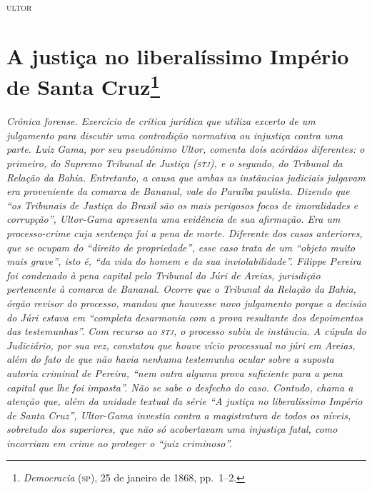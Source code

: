 \begin{flushright}
\textsc{ultor}
\end{flushright}

\chapter{A justiça no liberalíssimo Império de Santa Cruz\footnote{\emph{Democracia} (\textsc{sp}), 25 de janeiro de 1868, pp.~1--2.}}

\begin{didascalia}\itshape
Crônica forense. Exercício de crítica jurídica que utiliza excerto de um
julgamento para discutir uma contradição normativa ou injustiça contra
uma parte. Luiz Gama, por seu pseudônimo Ultor, comenta dois
acórdãos diferentes: o primeiro, do Supremo Tribunal de Justiça (\textsc{stj}), e
o segundo, do Tribunal da Relação da Bahia. Entretanto, a causa que
ambas as instâncias judiciais julgavam era proveniente da comarca de
Bananal, vale do Paraíba paulista. Dizendo que ``os Tribunais de Justiça
do Brasil são os mais perigosos focos de imoralidades e corrupção'',
Ultor-Gama apresenta uma evidência de sua afirmação. Era um
processo-crime cuja sentença foi a pena de morte. Diferente dos casos
anteriores, que se ocupam do ``direito de propriedade'', esse caso trata
de um ``objeto muito mais grave'', isto é, ``da vida do homem e da sua
inviolabilidade''. Filippe Pereira foi condenado à pena capital pelo
Tribunal do Júri de Areias, jurisdição pertencente à comarca de Bananal.
Ocorre que o Tribunal da Relação da Bahia, órgão revisor do processo,
mandou que houvesse novo julgamento porque a decisão do Júri estava em
``completa desarmonia com a prova resultante dos depoimentos das
testemunhas''. Com recurso ao \textsc{stj}, o processo subiu de instância. A
cúpula do Judiciário, por sua vez, constatou que houve vício processual
no júri em Areias, além do fato de que não havia nenhuma testemunha
ocular sobre a suposta autoria criminal de Pereira, ``nem outra alguma
prova suficiente para a pena capital que lhe foi imposta''. Não se sabe o
desfecho do caso. Contudo, chama a atenção que, além da unidade textual da
série ``A justiça no liberalíssimo Império de Santa Cruz'',
Ultor-Gama investia contra a magistratura de todos os níveis,
sobretudo dos superiores, que não só acobertavam uma injustiça fatal,
como incorriam em crime ao proteger o ``juiz criminoso''.
\end{didascalia}

\pagebreak

